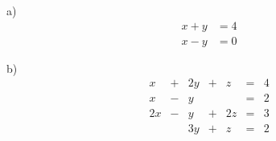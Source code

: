 \documentclass{article}
\begin{document}
\begin{flushleft}
\vspace{0.2in}

a)
\begin{align*}
x+y&=4\\
x-y&=0
\end{align*}
\vspace{0.1in}

\vspace{2in}

b)
\begin{equation*}
\begin{array}{ccccccr}
x& + &2y&+&z&= &4\\
x& - & y& & &= &2\\
2x&- & y&+&2z&=&3\\
  &  &3y&+& z&=&2
\end{array}
\end{equation*}

\end{flushleft}
\end{document}
